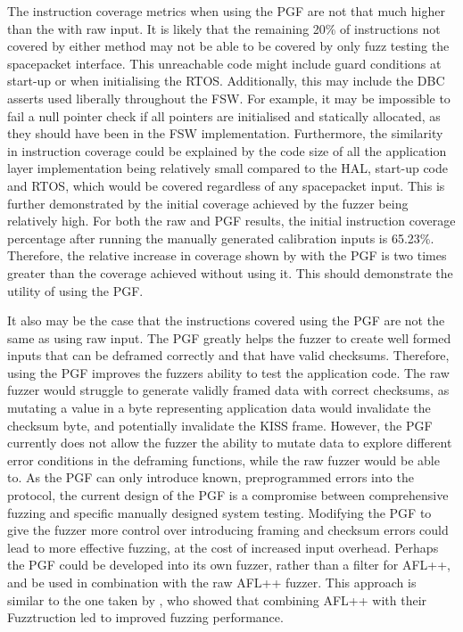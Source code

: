 \documentclass[../report.tex]{subfiles}
\begin{document}
The instruction coverage metrics when using the PGF are not that much higher
than the with raw input. It is likely that the remaining 20\% of instructions
not covered by either method may not be able to be covered by only fuzz testing
the spacepacket interface. This unreachable code might include guard conditions
at start-up or when initialising the RTOS. Additionally, this may include the
DBC asserts used liberally throughout the FSW. For example, it may be
impossible to fail a null pointer check if all pointers are initialised and
statically allocated, as they should have been in the FSW implementation.
Furthermore, the similarity in instruction coverage could be explained by the
code size of all the application layer implementation being relatively small
compared to the HAL, start-up code and RTOS, which would be covered regardless
of any spacepacket input. This is further demonstrated by the initial coverage
achieved by the fuzzer being relatively high. For both the raw and PGF results,
the initial instruction coverage percentage after running the manually
generated calibration inputs is 65.23\%. Therefore, the relative increase in
coverage shown by with the PGF is two times greater than the coverage achieved
without using it. This should demonstrate the utility of using the PGF.

It also may be the case that the instructions covered using the PGF are not the
same as using raw input. The PGF greatly helps the fuzzer to create well formed
inputs that can be deframed correctly and that have valid checksums. Therefore,
using the PGF improves the fuzzers ability to test the application code. The
raw fuzzer would struggle to generate validly framed data with correct
checksums, as mutating a value in a byte representing application data would
invalidate the checksum byte, and potentially invalidate the KISS frame.
However, the PGF currently does not allow the fuzzer the ability to mutate data
to explore different error conditions in the deframing functions, while the raw
fuzzer would be able to. As the PGF can only introduce known, preprogrammed
errors into the protocol, the current design of the PGF is a compromise between
comprehensive fuzzing and specific manually designed system testing. Modifying
the PGF to give the fuzzer more control over introducing framing and checksum
errors could lead to more effective fuzzing, at the cost of increased input
overhead. Perhaps the PGF could be developed into its own fuzzer, rather than a filter
for AFL++, and be used in combination with the raw AFL++ fuzzer. This approach
is similar to the one taken by \citet{Fuzztruction_2023}, who showed that
combining AFL++ with their Fuzztruction led to improved fuzzing performance.
\end{document}

